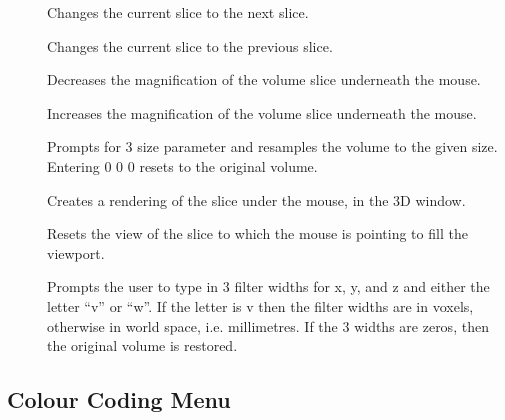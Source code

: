 \begin{description}
\item[]  Changes the current slice to the next slice.
\item[]  Changes the current slice to the previous slice.
\item[]  Decreases the magnification of the
       volume slice underneath the mouse.
\item[]  Increases the magnification of the
       volume slice underneath the mouse.
\item[]  Prompts for 3 size parameter and
       resamples the volume to the given size.  Entering 0 0 0 resets to
       the original volume.
\item[]  Creates a rendering of the slice
       under the mouse, in the 3D window.
\item[]  Resets the view of the slice
       to which the mouse is pointing to fill the viewport.
\item[]  Prompts the user to type in
       3 filter widths for x, y, and z and either the letter ``v'' or
       ``w''.  If the letter is v then the filter widths are in voxels,
       otherwise in world space, i.e. millimetres.  If the 3 widths are
       zeros, then the original volume is restored.
\end{description}

\subsection{Colour Coding Menu}


